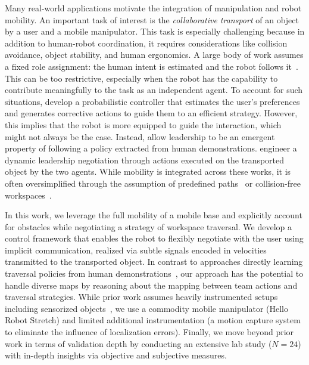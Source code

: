 Many real-world applications motivate the integration of manipulation and robot mobility. An important task of interest is the \emph{collaborative transport} of an object by a user and a mobile manipulator. This task is especially challenging because in addition to human-robot coordination, it requires considerations like collision avoidance, object stability, and human ergonomics. A large body of work assumes a fixed role assignment: the human intent is estimated and the robot follows it~\citep{bussy2012transportation,bussy2012proactive,mielke2024comanipulation,lima2023assistive,solanes2018human}. This can be too restrictive, especially when the robot has the capability to contribute meaningfully to the task as an independent agent. To account for such situations, \citet{nikolaidis2017mutual} develop a probabilistic controller that estimates the user's preferences and generates corrective actions to guide them to an efficient strategy. However, this implies that the robot is more equipped to guide the interaction, which might not always be the case. Instead, \citet{ng2023takes} allow leadership to be an emergent property of following a policy extracted from human demonstrations. \citet{mortl2012role} engineer a dynamic leadership negotiation through actions executed on the transported object by the two agents.
While mobility is integrated across these works, it is often oversimplified through the assumption of predefined paths~\citep{mortl2012role} or collision-free workspaces~\citep{bussy2012transportation,bussy2012proactive}.

In this work, we leverage the full mobility of a mobile base and explicitly account for obstacles while negotiating a strategy of workspace traversal. We develop a control framework that enables the robot to flexibly negotiate with the user using implicit communication, realized via subtle signals encoded in velocities transmitted to the transported object. In contrast to approaches directly learning traversal policies from human demonstrations~\citep{ng2023takes}, our approach has the potential to handle diverse maps by reasoning about the mapping between team actions and traversal strategies. While prior work assumes heavily instrumented setups including sensorized objects~\citep{mielke2024comanipulation,bussy2012proactive,bussy2012transportation,gienger2018contactchanges}, we use a commodity mobile manipulator (Hello Robot Stretch) and limited additional instrumentation (a motion capture system to eliminate the influence of localization errors). Finally, we move beyond prior work in terms of validation depth by conducting an extensive lab study ($N=24$) with in-depth insights via objective and subjective measures.


